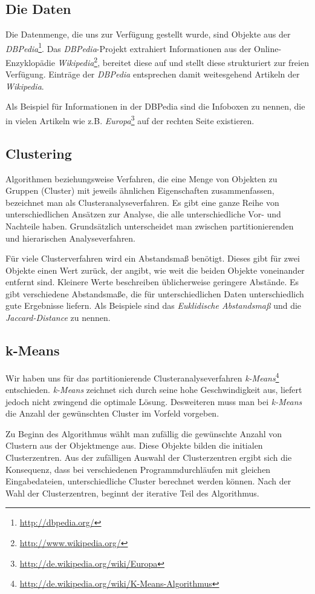 \documentclass[a4paper]{llncs}
\begin{document}
\subsection{Die Daten}
Die Datenmenge, die uns zur Verfügung gestellt wurde, sind Objekte aus der \emph{DBPedia}\footnote{\url{http://dbpedia.org/}}. Das \emph{DBPedia}-Projekt extrahiert Informationen aus der Online-Enzyklopädie \emph{Wikipedia}\footnote{\url{http://www.wikipedia.org/}}, bereitet diese auf und stellt diese strukturiert zur freien Verfügung. Einträge der \emph{DBPedia} entsprechen damit weitesgehend Artikeln der \emph{Wikipedia}.

Als Beispiel für Informationen in der DBPedia sind die Infoboxen zu nennen, die in vielen Artikeln wie z.B. \emph{Europa}\footnote{\url{http://de.wikipedia.org/wiki/Europa}} auf der rechten Seite existieren.

\subsection{Clustering}
Algorithmen beziehungsweise Verfahren, die eine Menge von Objekten zu Gruppen (Cluster) mit jeweils ähnlichen Eigenschaften zusammenfassen, bezeichnet man als Clusteranalyseverfahren. Es gibt eine ganze Reihe von unterschiedlichen Ansätzen zur Analyse, die alle unterschiedliche Vor- und Nachteile haben. Grundsätzlich unterscheidet man zwischen partitionierenden und hierarischen Analyseverfahren.

Für viele Clusterverfahren wird ein Abstandsmaß benötigt. Dieses gibt für zwei Objekte einen Wert zurück, der angibt, wie weit die beiden Objekte voneinander entfernt sind. Kleinere Werte beschreiben üblicherweise geringere Abstände. Es gibt verschiedene Abstandsmaße, die für unterschiedlichen Daten unterschiedlich gute Ergebnisse liefern. Als Beispiele sind das \emph{Euklidische Abstandsmaß} und die \emph{Jaccard-Distance} zu nennen.

\subsection{k-Means}
Wir haben uns für das partitionierende Clusteranalyseverfahren \emph{k-Means}\footnote{\url{http://de.wikipedia.org/wiki/K-Means-Algorithmus}} entschieden. \emph{k-Means} zeichnet sich durch seine hohe Geschwindigkeit aus, liefert jedoch nicht zwingend die optimale Lösung. Desweiteren muss man bei \emph{k-Means} die Anzahl der gewünschten Cluster im Vorfeld vorgeben.

Zu Beginn des Algorithmus wählt man zufällig die gewünschte Anzahl von Clustern aus der Objektmenge aus. Diese Objekte bilden die initialen Clusterzentren. Aus der zufälligen Auswahl der Clusterzentren ergibt sich die Konsequenz, dass bei verschiedenen Programmdurchläufen mit gleichen Eingabedateien, unterschiedliche Cluster berechnet werden können. Nach der Wahl der Clusterzentren, beginnt der iterative Teil des Algorithmus.
\end{document}
